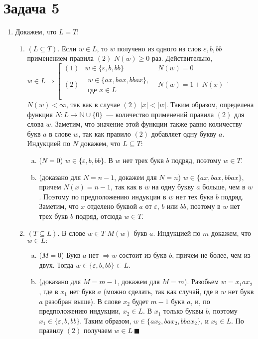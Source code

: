 \documentclass[a4paper]{article}
\begin{document}
\section*{Задача 5}
\begin{enumerate}[1.]
\item
Докажем, что $L=T$:
\begin{enumerate}[1.]
\item $(L\subseteq T)$. Если $w\in L$, то $w$ получено из одного из слов $\varepsilon,b,bb$ применением правила $(2)$ $N(w)\geqslant 0$ раз. Действительно, $w\in L\Rightarrow
\left[
\begin{array}{lll}
(1) & w\in\{\varepsilon,b,bb\} & N(w)=0\\
(2) & \substack{w\in\{ax,bax,bbax\},\\\text{где } x\in L} & N(w)=1+N(x)\\
\end{array}
\right.
$. $N(w)<\infty$, так как в случае $(2)$ $|x|<|w|$.\newline
Таким образом, определена функция $N:L\longrightarrow {\mathbb N}\cup\{0\}$~--- количество применений правила $(2)$ для слова $w$. Заметим, что значение этой функции также равно количеству букв $a$ в слове $w$, так как правило $(2)$ добавляет одну букву $a$. Индукцией по $N$ докажем, что $L\subseteq T$:
\begin{enumerate}[a.]
\item ($N=0$) $w\in \{\varepsilon,b,bb\}$. В $w$ нет трех букв $b$ подряд, поэтому $w\in T$.
\item (доказано для $N=n-1$, докажем для $N=n$) $w\in \{ax,bax,bbax\}$, причем $N(x)=n-1$, так как в $w$ на одну букву $a$ больше, чем в $w$. Поэтому по предположению индукции в $w$ нет тех букв $b$ подряд. Заметим, что $x$ отделено буквой $a$ от $\varepsilon$, $b$ или $bb$, поэтому в $w$ нет трех букв $b$ подряд, отсюда $w\in T$.
\end{enumerate}
\item $(T\subseteq L)$. В слове $w\in T$ $M(w)$ букв $a$. Индукцией по $m$ докажем, что $w\in L:$
\begin{enumerate}[a.]
\item ($M=0$) Букв $a$ нет $\Rightarrow w$ состоит из букв $b$, причем не более, чем из двух. Тогда $w\in \{\varepsilon,b,bb\}\subset L$.
\item (доказано для $M=m-1$, докажем для $M=m$). Разобьем $w=x_1ax_2$, где в $x_1$ нет букв $a$ (можно сделать, так как случай, где в $w$ нет букв $a$ разобран выше). В слове $x_2$ будет $m-1$ букв $a$, и, по предположению индукции, $x_2\in L$. В $x_1$ только буквы $b$, поэтому $x_1\in\{\varepsilon,b,bb\}$. Таким образом, $w\in\{ax_2,bax_2,bbax_2\}$, и $x_2\in L$. По правилу $(2)$ получаем $w\in L~\blacksquare$

\end{enumerate}
\end{enumerate}
\end{enumerate}
\end{document}
